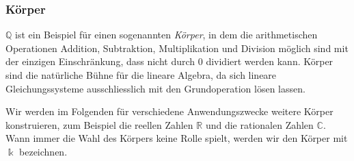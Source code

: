 \subsubsection{Körper}
$\mathbb{Q}$ ist ein Beispiel für einen sogenannten {\em Körper}, 
%
in dem die arithmetischen Operationen Addition, Subtraktion, Multiplikation
und Division möglich sind mit der einzigen Einschränkung, dass nicht durch
$0$ dividiert werden kann.
Körper sind die natürliche Bühne für die lineare Algebra, da sich lineare
Gleichungssysteme ausschliesslich mit den Grundoperation lösen lassen.

Wir werden im Folgenden für verschiedene Anwendungszwecke weitere Körper
konstruieren, zum Beispiel die reellen Zahlen $\mathbb{R}$ und die
rationalen Zahlen $\mathbb{C}$.
Wann immer die Wahl des Körpers keine Rolle spielt, werden wir den
Körper mit $\Bbbk$ bezeichnen.
\index{$\Bbbk$}%



